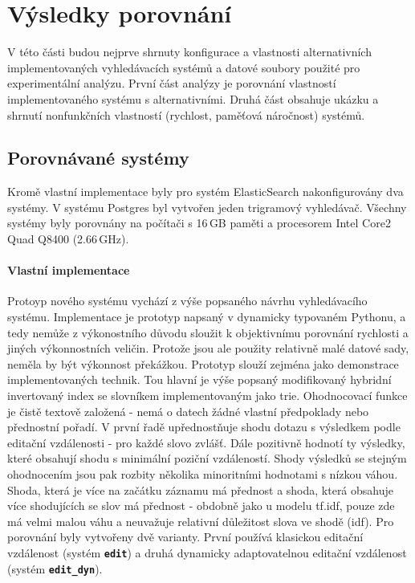 \documentclass[11pt,letterpaper,oneside,openright]{book}
\newcommand{\bftt}[1]{\texttt{\textbf{#1}}}
\begin{document}
\chapter{Výsledky porovnání} \label{sec:results}
V této části budou nejprve shrnuty konfigurace a vlastnosti alternativních
implementovaných vyhledávacích systémů a datové soubory použité pro
experimentální analýzu.  První část analýzy je porovnání vlastností
implementovaného systému s alternativními. Druhá část obsahuje ukázku a shrnutí
nonfunkčních vlastností (rychlost, paměťová náročnost) systémů.

\section{Porovnávané systémy}
Kromě vlastní implementace byly pro systém ElasticSearch nakonfigurovány
dva systémy. V systému Postgres byl vytvořen jeden trigramový
vyhledávač. Všechny systémy byly porovnány na počítači s 16\,GB paměti a
procesorem Intel Core2 Quad Q8400 (2.66\,GHz).

\subsubsection{Vlastní implementace}
Protoyp nového systému vychází z výše popsaného návrhu vyhledávacího systému.
Implementace je prototyp napsaný v dynamicky typovaném Pythonu, a tedy nemůže z
výkonostního důvodu sloužit k objektivnímu porovnání rychlosti a jiných
výkonnostních veličin. Protože jsou ale použity relativně malé datové sady,
neměla by být výkonnost překážkou. Prototyp slouží zejména jako demonstrace
implementovaných technik. Tou hlavní je výše popsaný modifikovaný hybridní
invertovaný index se slovníkem implementovaným jako trie. Ohodnocovací funkce
je čistě textově založená - nemá o datech žádné vlastní předpoklady nebo
přednostní pořadí. V první řadě upřednostňuje shodu dotazu s výsledkem podle
editační vzdálenosti - pro každé slovo zvlášť. Dále pozitivně hodnotí ty
výsledky, které obsahují shodu s minimální poziční vzdáleností.  Shody výsledků
se stejným ohodnocením jsou pak rozbity několika minoritními hodnotami s nízkou
váhou. Shoda, která je více na začátku záznamu má přednost a shoda, která
obsahuje více shodujících se slov má přednost - obdobně jako u modelu tf.idf,
pouze zde má velmi malou váhu a neuvažuje relativní důležitost slova ve shodě
(idf). Pro porovnání byly vytvořeny dvě varianty. První používá klasickou
editační vzdálenost (systém \bftt{edit}) a druhá dynamicky adaptovatelnou
editační vzdálenost (systém \bftt{edit\_dyn}).
\end{document}
